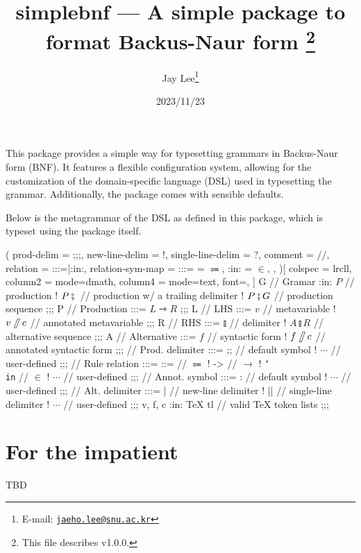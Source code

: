 \documentclass[a4paper]{article}
\title{%
  \textsf{simplebnf} --- A simple package to format Backus-Naur form%
  \footnote{This file describes v1.0.0.}}
\author{Jay Lee\footnote{E-mail: %
  \href{mailto:jaeho.lee@snu.ac.kr}{\texttt{jaeho.lee@snu.ac.kr}}}}
\date{2023/11/23}
\begin{document}
\maketitle


\vfill
This package provides a simple way for typesetting grammars in Backus-Naur form (BNF).
It features a flexible configuration system, allowing for the customization of the domain-specific language (DSL) used in typesetting the grammar.
Additionally, the package comes with sensible defaults.

Below is the metagrammar of the DSL as defined in this package, which is typeset using the package itself.
\begin{tcolorbox}[breakable]
  \begin{bnf}(
    prod-delim = ;;;,
    new-line-delim = !,
    single-line-delim = ?,
    comment = //,
    relation = {:::=|:in:},
    relation-sym-map =
      {
        {:::=} = $\Coloneqq$,
        {:in:} = $\in$,
      },
  )[
    colspec = lrcll,
    column{2} = {mode=dmath},
    column{4} = {mode=text, font=\ttfamily},
  ]
    G // Gramar :in:
      $P$ // production
    ! $P \fatsemi {}$ // production w/ a trailing delimiter
    ! $P \fatsemi G$ // production sequence
  ;;;
    P // Production :::= $L \rightarrowtriangle R$
  ;;;
    L // LHS :::=
      $v$ // metavariable
    ! $v\!\fatslash\,c$ // annotated metavariable
  ;;;
    R // RHS :::=
      $\talloblong$ // delimiter
    ! $A \talloblong R$ // alternative sequence
  ;;;
    A // Alternative :::=
      $f$ // syntactic form
    ! $f\!\fatslash\,c$ // annotated syntactic form
  ;;;
    \fatsemi // Prod. delimiter :::=
      ;; // default symbol
    ! $\cdots$ // user-defined
  ;;;
    \rightarrowtriangle // Rule relation :::=
      ::= // $\Coloneqq$
    ! -> // $\to$
    ! \texttt{\char`\\in} // $\in$
    ! $\cdots$ // user-defined
  ;;;
    \fatslash // Annot. symbol :::=
      : // default symbol
    ! $\cdots$ // user-defined
  ;;;
    \talloblong // Alt. delimiter :::=
      | // new-line delimiter
    ! || // single-line delimiter
    ! $\cdots$ // user-defined
  ;;;
    v, f, c :in: \textsf{\TeX{} tl} // valid \TeX{} token lists
  ;;;
  \end{bnf}
\end{tcolorbox}
\vfill

\section{For the impatient}
TBD
\end{document}
